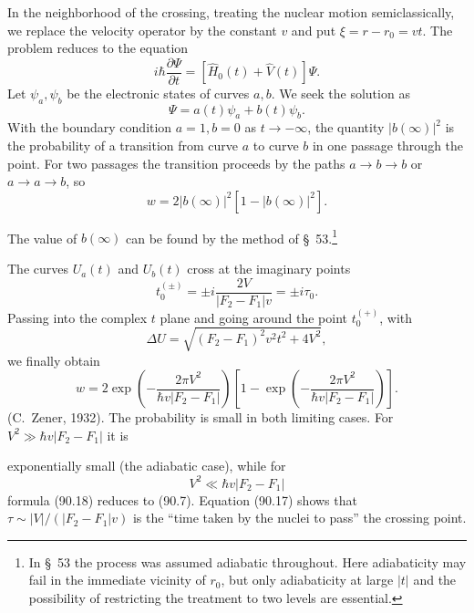 In the neighborhood of the crossing, treating the nuclear motion semiclassically, we replace the velocity operator by the constant $v$ and put $\xi=r-r_0=vt$. The problem reduces to the equation
\begin{equation}i\hbar\frac{\partial\Psi}{\partial t}=[\widehat H_0(t)+\widehat V(t)]\Psi.\tag{90.13}\end{equation}
Let $\psi_a,\psi_b$ be the electronic states of curves $a,b$. We seek the solution as
\begin{equation}\Psi=a(t)\psi_a+b(t)\psi_b.\tag{90.14}\end{equation}
With the boundary condition $a=1,b=0$ as $t\to-\infty$, the quantity $|b(\infty)|^2$ is the probability of a transition from curve $a$ to curve $b$ in one passage through the point. For two passages the transition proceeds by the paths $a\to b\to b$ or $a\to a\to b$, so
\begin{equation}w=2|b(\infty)|^2[1-|b(\infty)|^2].\tag{90.15}\end{equation}

The value of $b(\infty)$ can be found by the method of \S~53.\footnote{In \S~53 the process was assumed adiabatic throughout. Here adiabaticity may fail in the immediate vicinity of $r_0$, but only adiabaticity at large $|t|$ and the possibility of restricting the treatment to two levels are essential.}

The curves $U_a(t)$ and $U_b(t)$ cross at the imaginary points
\begin{equation}t_0^{(\pm)}=\pm i\frac{2V}{|F_2-F_1|v}=\pm i\tau_0.\tag{90.16}\end{equation}
Passing into the complex $t$ plane and going around the point $t_0^{(+)}$, with
\begin{equation}\Delta U=\sqrt{(F_2-F_1)^2v^2t^2+4V^2},\tag{90.17}\end{equation}
we finally obtain
\begin{equation}w=2\exp\left(-\frac{2\pi V^2}{\hbar v|F_2-F_1|}\right)\left[1-\exp\left(-\frac{2\pi V^2}{\hbar v|F_2-F_1|}\right)\right].\tag{90.18}\end{equation}
(C.~Zener, 1932). The probability is small in both limiting cases. For $V^2\gg\hbar v|F_2-F_1|$ it is

exponentially small (the adiabatic case), while for
\begin{equation}V^2\ll\hbar v|F_2-F_1|\tag{90.19}\end{equation}
formula (90.18) reduces to (90.7). Equation (90.17) shows that $\tau\sim|V|/(|F_2-F_1|v)$ is the ``time taken by the nuclei to pass'' the crossing point.

